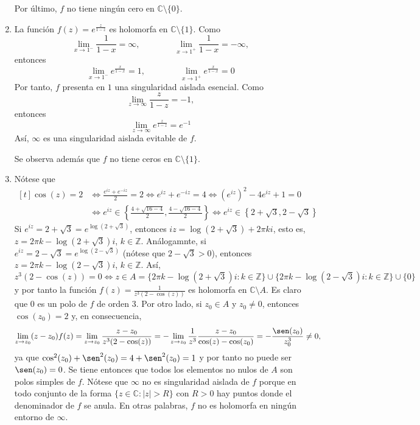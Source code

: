 \documentclass[11pt]{report}
\makeatletter
\renewenvironment{proof}[1][\proofname]{\par
  \pushQED{\qed}%
  \normalfont \topsep\z@skip %
  \trivlist
  \item[\hskip\labelsep
        \itshape
    #1\@addpunct{.}]\ignorespaces
}{%
  \popQED\endtrivlist\@endpefalse
}
\newcommand{\Z}{\mathbb Z}
\newcommand{\C}{\mathbb C}
\makeatother
\begin{document}
\begin{proof}
\begin{enumerate}
    Por último, $f$ no tiene ningún cero en $\C \setminus\{0\}$.
    \item La función $f(z)=e^{\frac{z}{1-z}}$ es holomorfa en $\C \setminus \{1\}$. Como
    \[\lim_{x \to 1^-} \frac{1}{1-x} = \infty, \qquad \qquad \lim_{x \to 1^+}\frac{1}{1-x} = -\infty,\]
    entonces
    \[\lim_{x \to 1^-} e^{\frac{x}{1-x}} = 1, \qquad \qquad \lim_{x \to 1^+}e^{\frac{x}{1-x}} = 0\]
    Por tanto, $f$ presenta en $1$ una singularidad aislada esencial. Como
    \[\lim_{z \to \infty} \frac{z}{1-z} = -1,\]
    entonces
    \[\lim_{z \to \infty}e^{\frac{z}{1-z}} = e^{-1}\]
    Así, $\infty$ es una singularidad aislada evitable de $f$.

    Se observa además que $f$ no tiene ceros en $\C \setminus \{1\}$.
    \item Nótese que
    \[
    \begin{aligned}[t]
    \cos(z)=2 &\iff \frac{e^{iz}+e^{-iz}}{2} = 2 \iff e^{iz}+e^{-iz} = 4 \iff (e^{iz})^2-4e^{iz}+1 = 0 \\ &\iff e^{iz} \in \left\{ \frac{4+ \sqrt{16-4}}{2},\frac{4- \sqrt{16-4}}{2}\right\} \iff e^{iz} \in \left\{2+\sqrt{3}, 2-\sqrt{3}\right\}
  \end{aligned}\]
  Si $e^{iz} = 2+\sqrt{3}= e^{\log(2+\sqrt{3})}$, entonces $iz=\log(2+\sqrt{3})+2\pi ki$, esto es, $z = 2\pi k -\log(2+\sqrt{3})i$, $k \in \Z$. Análogamnte, si $e^{iz} = 2-\sqrt{3} = e^{\log(2-\sqrt{3})}$ (nótese que $2-\sqrt{3}>0$), entonces $z = 2\pi k -\log(2-\sqrt{3})i$, $k \in \Z$. Así, 
  \[z^3(2-\cos(z)) = 0 \iff z \in A= \{2\pi k-\log(2+\sqrt{3})i \colon k \in \Z\} \cup \{2\pi k-\log(2-\sqrt{3})i \colon k \in \Z\} \cup \{0\} \]
  y por tanto la función $f(z)=\frac{1}{z^3(2-\cos(z))}$ es holomorfa en $\C \setminus A $. Es claro que $0$ es un polo de $f$ de orden 3. Por otro lado, si $z_0 \in A$ y $z_0 \neq 0$, entonces $\cos(z_0) = 2$ y, en consecuencia,
  \[\lim_{z \to z_0}(z-z_0)f(z)= \lim_{z \to z_0}\frac{z-z_0}{z^3(2-\cos(z))} = -\lim_{z \to z_0}\frac{1}{z^3}\frac{z-z_0}{\cos(z)-\cos(z_0)} = -\frac{\sen(z_0)}{z_0^3} \neq 0,\]
  ya que $\cos^2(z_0)+\sen^2(z_0) = 4+\sen^2(z_0) =  1$ y por tanto no puede ser $\sen(z_0) = 0$. Se tiene entonces que todos los elementos no nulos de $A$ son polos simples de $f$. Nótese que $\infty$ no es singularidad aislada de $f$ porque en todo conjunto de la forma $\{z \in \C \colon |z| > R\}$ con $R >0$ hay puntos donde el denominador de $f$ se anula. En otras palabras, $f$ no es holomorfa en ningún entorno de $\infty$.


\end{enumerate}
\end{proof}
\end{document}
